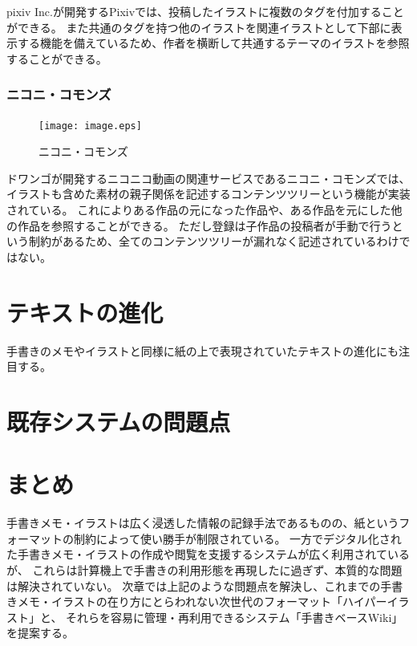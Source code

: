 pixiv Inc.が開発するPixivでは、投稿したイラストに複数のタグを付加することができる。
また共通のタグを持つ他のイラストを関連イラストとして下部に表示する機能を備えているため、作者を横断して共通するテーマのイラストを参照することができる。

\subsubsection{ニコニ・コモンズ}

\begin{figure}[htbp]
    \begin{center}
    {\texttt{[image: image.eps]}} \end{center}
    \caption{ニコニ・コモンズ}
\end{figure}

ドワンゴが開発するニコニコ動画の関連サービスであるニコニ・コモンズでは、イラストも含めた素材の親子関係を記述するコンテンツツリーという機能が実装されている。
これによりある作品の元になった作品や、ある作品を元にした他の作品を参照することができる。
ただし登録は子作品の投稿者が手動で行うという制約があるため、全てのコンテンツツリーが漏れなく記述されているわけではない。


\section{テキストの進化}
手書きのメモやイラストと同様に紙の上で表現されていたテキストの進化にも注目する。

\section{既存システムの問題点}

\section{まとめ}
手書きメモ・イラストは広く浸透した情報の記録手法であるものの、紙というフォーマットの制約によって使い勝手が制限されている。
一方でデジタル化された手書きメモ・イラストの作成や閲覧を支援するシステムが広く利用されているが、
これらは計算機上で手書きの利用形態を再現したに過ぎず、本質的な問題は解決されていない。
次章では上記のような問題点を解決し、これまでの手書きメモ・イラストの在り方にとらわれない次世代のフォーマット「ハイパーイラスト」と、
それらを容易に管理・再利用できるシステム「手書きベースWiki」を提案する。